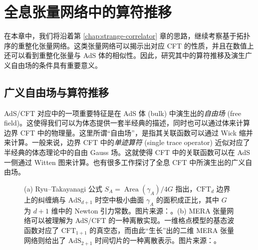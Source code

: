 \chapter{全息张量网络中的算符推移}
\label{chap:operator-pushing}

在本章中，我们将沿着第 \ref{chap:strange-correlator} 章的思路，继续考察基于拓扑序的重整化张量网络。这类张量网络可以揭示出对应 CFT 的性质，并且在数值上还可以看到重整化张量与 AdS 体的相似性。因此，研究其中的算符推移及演生广义自由场的条件具有重要意义。

\section{广义自由场与算符推移}

AdS/CFT 对应\cite{maldacena1999large}中的一项重要特征是在 AdS 体 (bulk) 中演生出的\emph{自由场} (free field)。这使得我们可以为体态提供一套半经典的描述，同时也可以通过体来计算边界 CFT 中的物理量。这里所谓“自由场”，是指其关联函数可以通过 Wick 缩并来计算。一般来说，边界 CFT 中的\emph{单迹算符} (single trace operator) 近似对应了半经典的体态理论中的自由 Gauss 场。这就使得 CFT 中的关联函数可以在 AdS 一侧通过 Witten 图来计算\cite{witten1998anti,gubser1998gauge}。也有很多工作探讨了全息 CFT 中所演生出的广义自由场\cite{dutsch2003generalized,liu2019dimensional,collier2019quantum,nebabu2023bulk}。

\begin{figure}[htb]
  \centering
   \qquad
  \caption[全息张量网络与 AdS/CFT 对应]{(a) Ryu--Takayanagi 公式 $S_A=\operatorname{Area}(\gamma_A)/4G$ 指出，$\text{CFT}_d$ 边界上的纠缠熵与 $\text{AdS}_{d+1}$ 时空中极小曲面 $\gamma_A$ 的面积成正比，其中 $G$ 为 $d+1$ 维中的 Newton 引力常数。图片来源：\parencite{nishioka2009holographic}。(b) MERA 张量网络可以被理解为 AdS/CFT 的一种离散实现。一维格点模型的基态波函数对应了 $\text{CFT}_{1+1}$ 的真空态，而由此“生长”出的二维 MERA 张量网络则给出了 $\text{AdS}_{2+1}$ 时间切片的一种离散表示。图片来源：\parencite{evenbly2011tensor}。}
\end{figure}

